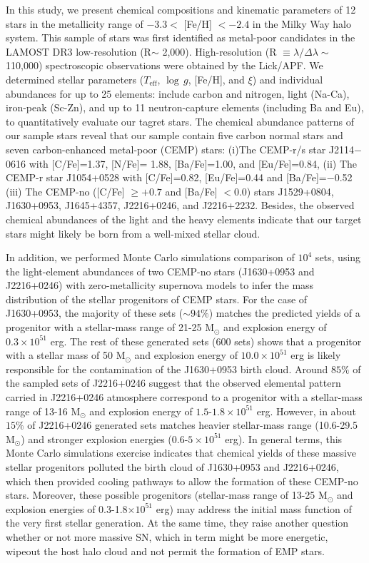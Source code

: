 In this study, we present chemical compositions and kinematic parameters of 12 stars in the metallicity range of $-3.3<$  [Fe/H] $<-2.4$ in the Milky Way halo system. This sample of stars was first identified as metal-poor candidates in the LAMOST DR3 low-resolution (R$ \sim$ 2,000). High-resolution (R $\equiv \lambda /\Delta \lambda \sim$ ~ 110,000) spectroscopic observations were obtained by the Lick/APF. We determined stellar parameters (\ensuremath{T_\mathrm{eff}}, \ensuremath{\log\,g}, [Fe/H], and $\xi$) and individual abundances for up to 25 elements: include carbon and nitrogen, light (Na-Ca), iron-peak (Sc-Zn), and up to 11 neutron-capture elements (including Ba and Eu), to quantitatively evaluate our tagret stars. The chemical abundance patterns of our sample stars reveal that our sample contain five carbon normal stars and seven carbon-enhanced metal-poor (CEMP) stars: (i)The CEMP-r/s star J2114$-$0616 with [C/Fe]=1.37,  [N/Fe]= 1.88, [Ba/Fe]=1.00, and [Eu/Fe]=0.84, (ii) The CEMP-r star J1054+0528 with [C/Fe]=0.82, [Eu/Fe]=0.44 and [Ba/Fe]=$-$0.52 (iii) The CEMP-no ([C/Fe] $\geqslant +0.7$ and [Ba/Fe] $< 0.0$) stars J1529+0804, J1630+0953, J1645+4357, J2216+0246, and J2216+2232. Besides, the observed chemical abundances of the light and the heavy elements indicate that our target stars might likely be born from a well-mixed stellar cloud. 


In addition, we performed Monte Carlo simulations comparison of $10^{4}$ sets, using the light-element abundances of two CEMP-no stars (J1630+0953 and J2216+0246) with zero-metallicity supernova models to infer the mass distribution of the stellar progenitors of CEMP stars. For the case of J1630+0953, the majority of these sets ($\sim 94\%$) matches the predicted yields of a progenitor with a stellar-mass range of 21-25 M$_{\odot}$ and explosion energy of $0.3 \times 10^{51}$ erg. The rest of these generated sets (600 sets) shows that a progenitor with a stellar mass of 50 M$_{\odot}$ and explosion energy of $10.0 \times 10^{51}$ erg is likely responsible for the contamination of the J1630+0953 birth cloud. Around $85\%$ of the sampled sets of J2216+0246 suggest that the observed elemental pattern carried in J2216+0246 atmosphere correspond to a progenitor with a stellar-mass range of 13-16 M$_{\odot}$ and explosion energy of $1.5$-$1.8 \times 10^{51}$ erg. However, in about $15\%$ of J2216+0246 generated sets matches heavier stellar-mass range (10.6-29.5 M$_{\odot}$) and stronger explosion energies ($0.6$-$5 \times 10^{51}$ erg). In general terms, this Monte Carlo simulations exercise indicates that chemical yields of these massive stellar progenitors polluted the birth cloud of J1630+0953 and J2216+0246, which then provided cooling pathways to allow the formation of these CEMP-no stars. Moreover, these possible progenitors (stellar-mass range of 13-25 M$_{\odot}$ and explosion energies of 0.3-1.8$ \times 10^{51}$ erg) 
may address the initial mass function of the very first stellar generation. 
At the same time, they raise another question whether or not more massive SN, which in term might be more energetic, wipeout the host halo cloud and not permit the formation of EMP stars.

